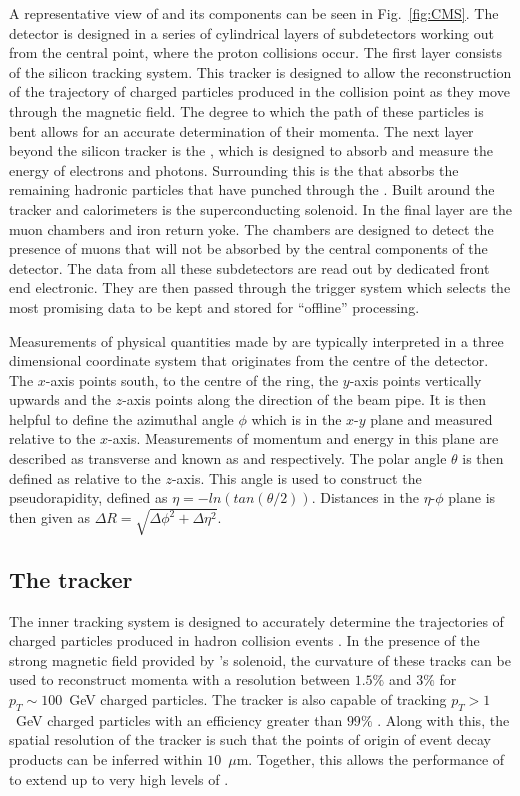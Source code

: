 A representative view of \CMS and its components can be seen in
Fig.~\ref{fig:CMS}. The detector is designed in a series of
cylindrical layers of subdetectors working out from the central point,
where the proton collisions occur. The first layer consists of the
silicon tracking system. This tracker is designed to allow the
reconstruction of the trajectory of charged particles produced in the
collision point as they move through the magnetic field. The degree to
which the path of these particles is bent allows for an accurate
determination of their momenta. The next layer beyond the silicon
tracker is the \ECAL, which is designed to absorb and measure the
energy of electrons and photons. Surrounding this is the \HCAL that
absorbs the remaining hadronic particles that have punched through the
\ECAL. Built around the tracker and calorimeters is the superconducting
solenoid. In the final layer are the muon chambers and iron return
yoke. The chambers are designed to detect the presence of muons that
will not be absorbed by the central components of the detector. The
data from all these subdetectors are read out by dedicated front end
electronic. They are then passed through the \CMS trigger system which
selects the most promising data to be kept and stored for ``offline''
processing. 

Measurements of physical quantities made by \CMS are typically
interpreted in a three dimensional coordinate system that originates
from the centre of the detector. The $x$-axis points south, to the
centre of the \LHC ring, the $y$-axis points vertically upwards and
the $z$-axis points along the direction of the \LHC beam pipe. It is
then helpful to define the azimuthal angle $\phi$ which is in the
$x$-$y$ plane and measured relative to the $x$-axis. Measurements of
momentum and energy in this plane are described as transverse and
known as \pt and \Et respectively. The polar angle $\theta$ is then
defined as relative to the $z$-axis. This angle is used to construct
the pseudorapidity, defined as $\eta=-ln(tan(\theta/2))$. Distances in
the $\eta$-$\phi$ plane is then given as $\Delta R =
\sqrt{\Delta\phi^2+\Delta\eta^2}$.

\subsection{The tracker} 

The \CMS inner tracking system is designed to accurately determine the
trajectories of charged particles produced in hadron collision events
\cite{Karimaki:368412}. In the presence of the strong magnetic field
provided by \CMS's solenoid, the curvature of these tracks can be used
to reconstruct momenta with a resolution between $1.5\%$ and $3\%$ for
$p_T\sim 100$~GeV charged particles. The tracker is also capable of
tracking \mbox{$p_T>1$~GeV} charged particles with an efficiency
greater than $99\%$ \cite{Bayatian:2006zz}. Along with this, the
spatial resolution of the tracker is such that the points of origin of
event decay products can be inferred within $10$~$\mu$m. Together,
this allows the performance of \CMS to extend up to very high levels
of \PU.%

